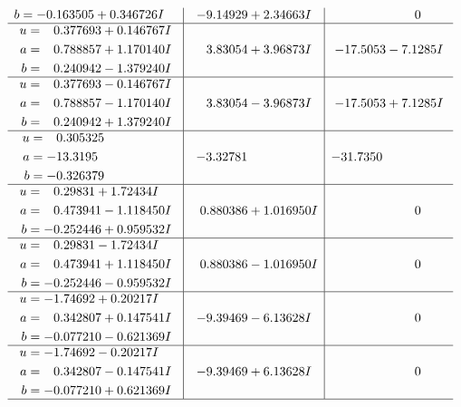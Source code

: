 \documentclass[1p]{elsarticle_modified}
\theoremstyle{definition}
\begin{document}
$$\begin{array}{c|c|c}
\begin{aligned}
b &= -0.163505 + 0.346726 I\end{aligned}
 & -9.14929 + 2.34663 I & \phantom{-0.000000 } 0 \\ \hline\begin{aligned}
u &= \phantom{-}0.377693 + 0.146767 I \\
a &= \phantom{-}0.788857 + 1.170140 I \\
b &= \phantom{-}0.240942 - 1.379240 I\end{aligned}
 & \phantom{-}3.83054 + 3.96873 I & -17.5053 - 7.1285 I \\ \hline\begin{aligned}
u &= \phantom{-}0.377693 - 0.146767 I \\
a &= \phantom{-}0.788857 - 1.170140 I \\
b &= \phantom{-}0.240942 + 1.379240 I\end{aligned}
 & \phantom{-}3.83054 - 3.96873 I & -17.5053 + 7.1285 I \\ \hline\begin{aligned}
u &= \phantom{-}0.305325\phantom{ +0.000000I} \\
a &= -13.3195\phantom{ +0.000000I} \\
b &= -0.326379\phantom{ +0.000000I}\end{aligned}
 & -3.32781\phantom{ +0.000000I} & -31.7350\phantom{ +0.000000I} \\ \hline\begin{aligned}
u &= \phantom{-}0.29831 + 1.72434 I \\
a &= \phantom{-}0.473941 - 1.118450 I \\
b &= -0.252446 + 0.959532 I\end{aligned}
 & \phantom{-}0.880386 + 1.016950 I & \phantom{-0.000000 } 0 \\ \hline\begin{aligned}
u &= \phantom{-}0.29831 - 1.72434 I \\
a &= \phantom{-}0.473941 + 1.118450 I \\
b &= -0.252446 - 0.959532 I\end{aligned}
 & \phantom{-}0.880386 - 1.016950 I & \phantom{-0.000000 } 0 \\ \hline\begin{aligned}
u &= -1.74692 + 0.20217 I \\
a &= \phantom{-}0.342807 + 0.147541 I \\
b &= -0.077210 - 0.621369 I\end{aligned}
 & -9.39469 - 6.13628 I & \phantom{-0.000000 } 0 \\ \hline\begin{aligned}
u &= -1.74692 - 0.20217 I \\
a &= \phantom{-}0.342807 - 0.147541 I \\
b &= -0.077210 + 0.621369 I\end{aligned}
 & -9.39469 + 6.13628 I & \phantom{-0.000000 } 0\\
 \hline 
 \end{array}$$\newpage
\end{document}
